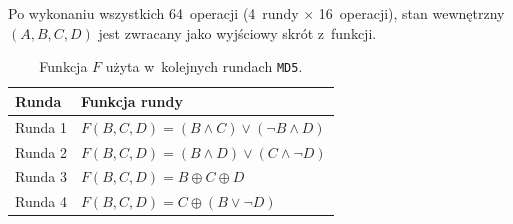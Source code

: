 \documentclass[12pt,a4paper,twoside]{article}
\begin{document}
\begin{myenumerate}
\begin{myenumerate}
\begin{itemize}
\begin{itemize}
            \end{itemize}

        \end{itemize}

    \end{myenumerate}

    \item Po wykonaniu wszystkich 64~operacji (4~rundy $\times$ 16~operacji),
    stan wewnętrzny $(A,B,C,D)$ jest zwracany jako wyjściowy skrót z~funkcji.

\end{myenumerate}

\begin{table}[htb]
    \caption{Funkcja $F$ użyta w~kolejnych rundach \texttt{MD5}.}
    \label{tbl:md5_round_function}
    \begin{tabular}{|l|l|}
        \hline
        Runda & Funkcja rundy \\
        \hline
        Runda 1 &
        $F(B,C,D) = (B \land C) \lor (\lnot B \land D)$ \\

        Runda 2 &
        $F(B,C,D) = (B \land D) \lor (C \land \lnot D)$ \\

        Runda 3 &
        $F(B,C,D) = B \oplus C \oplus D$ \\

        Runda 4 &
        $F(B,C,D) = C \oplus (B \lor \lnot D)$ \\
        \hline
    \end{tabular}
\end{table}
\end{document}
